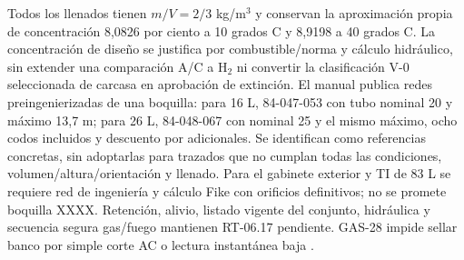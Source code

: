 Todos los llenados tienen $m/V=2/3$ kg/m$^3$ y conservan la aproximación propia de concentración 8,0826 por ciento a 10 grados C y 8,9198 a 40 grados C. La concentración de diseño se justifica por combustible/norma y cálculo hidráulico, sin extender una comparación A/C a H$_2$ ni convertir la clasificación V-0 seleccionada de carcasa en aprobación de extinción. El manual publica redes preingenierizadas de una boquilla: para 16 L, 84-047-053 con tubo nominal 20 y máximo 13,7 m; para 26 L, 84-048-067 con nominal 25 y el mismo máximo, ocho codos incluidos y descuento por adicionales. Se identifican como referencias concretas, sin adoptarlas para trazados que no cumplan todas las condiciones, volumen/altura/orientación y llenado. Para el gabinete exterior y TI de 83 L se requiere red de ingeniería y cálculo Fike con orificios definitivos; no se promete boquilla XXXX. Retención, alivio, listado vigente del conjunto, hidráulica y secuencia segura gas/fuego mantienen RT-06.17 pendiente. GAS-28 impide sellar banco por simple corte AC o lectura instantánea baja \parencite[sec.~8, tabla~1]{lote30-fike542}.

